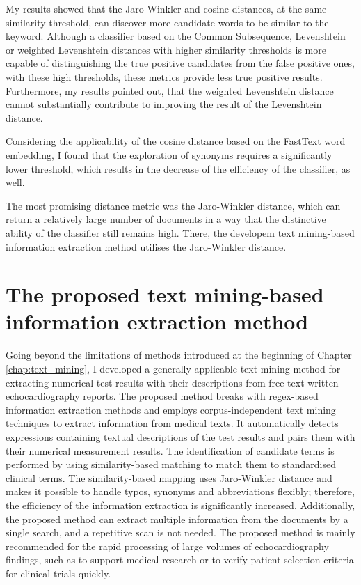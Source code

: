 My results showed that the Jaro-Winkler and cosine distances, at the same similarity threshold, can discover more candidate words to be similar to the keyword. Although a classifier based on the Common Subsequence, Levenshtein or weighted Levenshtein distances with higher similarity thresholds is more capable of distinguishing the true positive candidates from the false positive ones, with these high thresholds, these metrics provide less true positive results. Furthermore, my results pointed out, that the weighted Levenshtein distance cannot substantially contribute to improving the result of the Levenshtein distance.

Considering the applicability of the cosine distance based on the FastText word embedding, I found that the exploration of synonyms requires a significantly lower threshold, which results in the decrease of the efficiency of the classifier, as well.

The most promising distance metric was the Jaro-Winkler distance, which can return a relatively large number of documents in a way that the distinctive ability of the classifier still remains high. There, the developem text mining-based information extraction method utilises the Jaro-Winkler distance.

\section{The proposed text mining-based information extraction method}
\label{sec:tm_method}

Going beyond the limitations of methods introduced at the beginning of Chapter \ref{chap:text_mining}, I developed a generally applicable text mining method for extracting numerical test results with their descriptions from free-text-written echocardiography reports. The proposed method breaks with regex-based information extraction methods and employs corpus-independent text mining techniques to extract information from medical texts. It automatically detects expressions containing textual descriptions of the test results and pairs them with their numerical measurement results. The identification of candidate terms is performed by using similarity-based matching to match them to standardised clinical terms. The similarity-based mapping uses Jaro-Winkler distance and makes it possible to handle typos, synonyms and abbreviations flexibly; therefore, the efficiency of the information extraction is significantly increased. Additionally, the proposed method can extract multiple information from the documents by a single search, and a repetitive scan is not needed. The proposed method is mainly recommended for the rapid processing of large volumes of echocardiography findings, such as to support medical research or to verify patient selection criteria for clinical trials quickly.

